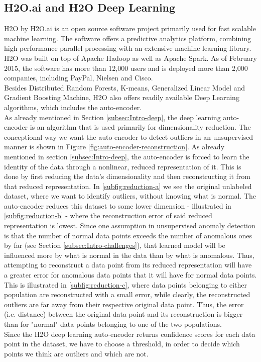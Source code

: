 \documentclass{vldb}
\begin{document}
\subsection{H2O.ai  and H2O Deep Learning}
\label{subsec:Metho-h2o}
H2O by H2O.ai is an open source software project primarily used for fast scalable machine learning. The software offers a predictive analytics platform, combining high performance parallel processing with an extensive machine learning library. \cite{website:h2o} H2O was built on top of Apache Hadoop as well as Apache Spark. As of February 2015, the software has more than 12,000 users and is deployed more than 2,000 companies, including PayPal, Nielsen and Cisco. \cite{booklet:deep-learning}\\
Besides Distributed Random Forests, K-means, Generalized Linear Model and Gradient Boosting Machine, H2O also offers readily available Deep Learning algorithms, which includes the auto-encoder. \\
As already mentioned in Section \ref{subsec:Intro-deep}, the deep learning auto-encoder is an algorithm that is used primarily for dimensionality reduction. The conceptional way we want the auto-encoder to detect outliers in an unsupervised manner is shown in Figure \ref{fig:auto-encoder-reconstruction}. As already mentioned in section \ref{subsec:Intro-deep}, the auto-encoder is forced to learn the identity of the data through a nonlinear, reduced representation of it. This is done by first reducing the data's dimensionality and then reconstructing it from that reduced representation. In \ref{subfig:reduction-a} we see the original unlabeled dataset, where we want to identify outliers, without knowing what is normal. The auto-encoder reduces this dataset to some lower dimension - illustrated in \ref{subfig:reduction-b} - where the reconstruction error of said reduced representation is lowest. Since one assumption in unsupervised anomaly detection is that the number of normal data points exceeds the number of anomalous ones by far (see Section \ref{subsec:Intro-challenges}), that learned model will be influenced more by what is normal in the data than by what is anomalous. Thus, attempting to reconstruct a data point from its reduced representation will have a greater error for anomalous data points that it will have for normal data points. This is illustrated in \ref{subfig:reduction-c}, where data points belonging to either population are reconstructed with a small error, while clearly, the reconstructed outliers are far away from their respective original data point. Thus, the error (i.e. distance) between the original data point and its reconstruction is bigger than for "normal" data points belonging to one of the two populations.\\
Since the H2O deep learning auto-encoder returns confidence scores for each data point in the dataset, we have to choose a threshold, in order to decide which points we think are outliers and which are not.
\end{document}
